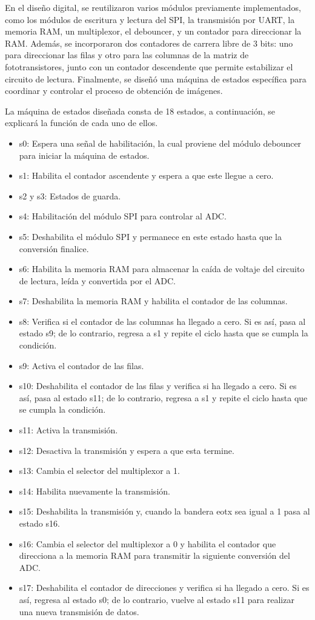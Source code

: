 En el diseño digital, se reutilizaron varios módulos previamente implementados, como los módulos de escritura y lectura del SPI, la transmisión por UART, la memoria RAM, un multiplexor, el debouncer, y un contador para direccionar la RAM. Además, se incorporaron dos contadores de carrera libre de 3 bits: uno para direccionar las filas y otro para las columnas de la matriz de fototransistores, junto con un contador descendente que permite estabilizar el circuito de lectura. Finalmente, se diseñó una máquina de estados específica para coordinar y controlar el proceso de obtención de imágenes.


La máquina de estados diseñada consta de 18 estados, a continuación, se explicará la función de cada uno de ellos.

\begin{itemize}
\item s0: Espera una señal de habilitación, la cual proviene del módulo debouncer para iniciar la máquina de estados.
\item s1: Habilita el contador ascendente y espera a que este llegue a cero.
\item s2 y s3: Estados de guarda.
\item s4: Habilitación del módulo SPI para controlar al ADC.
\item s5: Deshabilita el módulo SPI y permanece en este estado hasta que la conversión finalice.
\item s6: Habilita la memoria RAM para almacenar la caída de voltaje del circuito de lectura, leída y convertida por el ADC.
\item s7: Deshabilita la memoria RAM y habilita el contador de las columnas.
\item s8: Verifica si el contador de las columnas ha llegado a cero. Si es así, pasa al estado s9; de lo contrario, regresa a s1 y repite el ciclo hasta que se cumpla la condición.
\item s9: Activa el contador de las filas.
\item s10: Deshabilita el contador de las filas y verifica si ha llegado a cero. Si es así, pasa al estado s11; de lo contrario, regresa a s1 y repite el ciclo hasta que se cumpla la condición. 
\item s11: Activa la transmisión.
\item s12: Desactiva la transmisión y espera a que esta termine.
\item s13: Cambia el selector del multiplexor a 1.
\item s14: Habilita nuevamente la transmisión.
\item s15: Deshabilita la transmisión y, cuando la bandera eotx sea igual a 1 pasa al estado s16.
\item s16: Cambia el selector del multiplexor a 0 y habilita el contador que direcciona a la memoria RAM para transmitir la siguiente conversión del ADC.
\item s17: Deshabilita el contador de direcciones y verifica si ha llegado a cero. Si es así, regresa al estado s0; de lo contrario, vuelve al estado s11 para realizar una nueva transmisión de datos.
\end{itemize}


